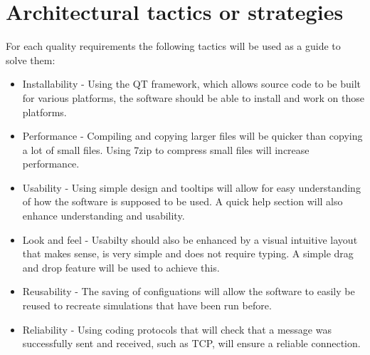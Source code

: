 \documentclass[a4paper,12pt,final]{article}
\begin{document}
\section{Architectural tactics or strategies}
For each quality requirements the following tactics will be used as a guide to solve them:
\begin{itemize}
\item Installability - Using the QT framework, which allows source code to be built for various platforms, the software should be able to install and work on those platforms.
\item Performance - Compiling and copying larger files will be quicker than copying a lot of small files. Using 7zip to compress small files will increase performance.
\item Usability - Using simple design and tooltips will allow for easy understanding of how the software is supposed to be used.  A quick help section will also enhance understanding and usability.
\item Look and feel - Usabilty should also be enhanced by a visual intuitive layout that makes sense, is very simple and does not require typing.  A simple drag and drop feature will be used to achieve this.
\item Reusability - The saving of configuations will allow the software to easily be reused to recreate simulations that have been run before.
\item Reliability - Using coding protocols that will check that a message was successfully sent and received, such as TCP, will ensure a reliable connection.
\end{itemize}
\end{document}
